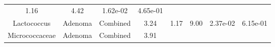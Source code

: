 \documentclass[12pt,]{article}
\begin{document}
\begin{longtable}[]{@{}cccccccc@{}}
\begin{minipage}[t]{0.13\columnwidth}
1.16\strut
\end{minipage} & \begin{minipage}[t]{0.13\columnwidth}\centering\strut
4.42\strut
\end{minipage} & \begin{minipage}[t]{0.07\columnwidth}\centering\strut
1.62e-02\strut
\end{minipage} & \begin{minipage}[t]{0.07\columnwidth}\centering\strut
4.65e-01\strut
\end{minipage}\tabularnewline
\begin{minipage}[t]{0.16\columnwidth}\centering\strut
Lactococcus\strut
\end{minipage} & \begin{minipage}[t]{0.08\columnwidth}\centering\strut
Adenoma\strut
\end{minipage} & \begin{minipage}[t]{0.09\columnwidth}\centering\strut
Combined\strut
\end{minipage} & \begin{minipage}[t]{0.05\columnwidth}\centering\strut
3.24\strut
\end{minipage} & \begin{minipage}[t]{0.13\columnwidth}\centering\strut
1.17\strut
\end{minipage} & \begin{minipage}[t]{0.13\columnwidth}\centering\strut
9.00\strut
\end{minipage} & \begin{minipage}[t]{0.07\columnwidth}\centering\strut
2.37e-02\strut
\end{minipage} & \begin{minipage}[t]{0.07\columnwidth}\centering\strut
6.15e-01\strut
\end{minipage}\tabularnewline
\begin{minipage}[t]{0.16\columnwidth}\centering\strut
Micrococcaceae\strut
\end{minipage} & \begin{minipage}[t]{0.08\columnwidth}\centering\strut
Adenoma\strut
\end{minipage} & \begin{minipage}[t]{0.09\columnwidth}\centering\strut
Combined\strut
\end{minipage} & \begin{minipage}[t]{0.05\columnwidth}\centering\strut
3.91\strut
\end{minipage} & \begin{minipage}[t]{0.13\columnwidth}\centering\strut

\end{minipage}
\end{longtable}
\end{document}
